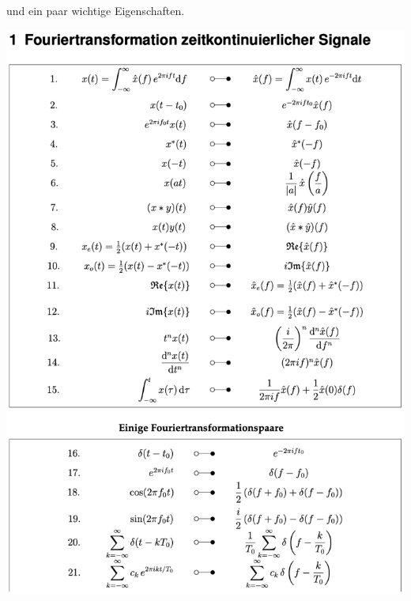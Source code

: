 \documentclass[11pt]{article}
\begin{document}
und ein paar wichtige Eigenschaften.

\vfill \null
\pagebreak

\begin{center}
    \includegraphics[width=0.85\linewidth]{docimgs/fs1.png}
\end{center}

\pagebreak
\end{document}
